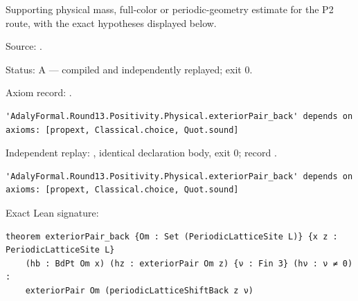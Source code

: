 \begin{theorem}[bp-472]
\label{bp-472}
\leanok
Supporting physical mass, full-color or periodic-geometry estimate for the P2 route, with the exact hypotheses displayed below.

\par Source: \texttt{}.
\par Status: A — compiled and independently replayed; exit 0.
\par Axiom record: \texttt{}.
\begin{verbatim}
'AdalyFormal.Round13.Positivity.Physical.exteriorPair_back' depends on axioms: [propext, Classical.choice, Quot.sound]
\end{verbatim}
\par Independent replay: \texttt{}, identical declaration body, exit 0; record \texttt{}.
\begin{verbatim}
'AdalyFormal.Round13.Positivity.Physical.exteriorPair_back' depends on axioms: [propext, Classical.choice, Quot.sound]
\end{verbatim}
\par Exact Lean signature:
\begin{verbatim}
theorem exteriorPair_back {Om : Set (PeriodicLatticeSite L)} {x z : PeriodicLatticeSite L}
    (hb : BdPt Om x) (hz : exteriorPair Om z) {ν : Fin 3} (hν : ν ≠ 0) :
    exteriorPair Om (periodicLatticeShiftBack z ν)
\end{verbatim}
\end{theorem}

